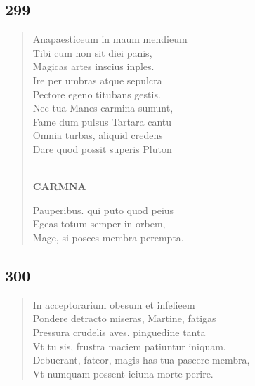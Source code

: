 \documentclass[11pt, a4paper]{report}
\begin{document}
            \subsection*{299}
      \begin{verse}
      Anapaesticeum in maum mendieum \\ Tibi cum non sit diei panis, \\ Magicas artes inscius inples. \\ Ire per umbras atque sepulcra \\ Pectore egeno titubans gestis. \\ Nec tua Manes carmina sumunt, \\ Fame dum pulsus Tartara cantu \\ Omnia turbas, aliquid credens \\ Dare quod possit superis Pluton \\ 
        ﻿\pagebreak 
     \marginpar{[254]} \begin{center} \textbf{CARMNA} \end{center}Pauperibus. qui puto quod peius \\ Egeas totum semper in orbem, \\ Mage, si posces membra perempta. \\ 
      \end{verse}
  
            \subsection*{300}
      \begin{verse}
      In acceptorarium obesum et infelieem \\ Pondere detracto miseras, Martine, fatigas \\ Pressura crudelis aves. pinguedine tanta \\ Vt tu sis, frustra maciem patiuntur iniquam. \\ Debuerant, fateor, magis has tua pascere membra, \\ Vt numquam possent ieiuna morte perire. \\ 
      \end{verse}
  
\end{document}
